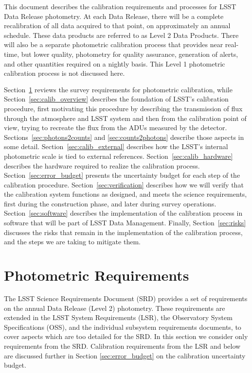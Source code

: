 \documentclass[12pt,preprint]{aastex}
\begin{document}
This document describes the calibration requirements and processes for
LSST Data Release photometry. At each Data Release, there will be a
complete recalibration of all data acquired to that point, on
approximately an annual schedule.  These data products are referred to
as Level 2 Data Products.  There will
also be a separate photometric calibration process that provides
near real-time, but lower quality, photometry for quality assurance,
generation of alerts, and other quantities required on a nightly
basis. This Level 1 photometric
calibration process is not discussed here.

Section~\ref{sec:photoreq} reviews the survey requirements for
photometric calibration, while Section~\ref{sec:calib_overview}
describes the foundation of LSST's calibration procedure, first
motivating this procedure by describing the transmission of flux
through the atmosphere and LSST system and then from the calibration
point of view, trying to recreate the flux from the ADUs measured
by the detector.
Sections~\ref{sec:photons2counts} and \ref{sec:counts2photons}
describe those aspects in some detail.
Section~\ref{sec:calib_external} describes how the LSST's internal
photometric scale is tied to external references.
Section~\ref{sec:calib_hardware} describes the hardware required
to realize the calibration process.
Section~\ref{sec:error_budget} presents the uncertainty budget for each step of the 
calibration procedure.
Section~\ref{sec:verification} describes how we will verify that the
calibration system functions as designed, and meets the science
requirements, first during the construction phase, and later during
survey operations.
Section~\ref{sec:software} describes the implementation of the calibration process
in software that will be part of LSST Data Management.
Finally, Section~\ref{sec:risks} discusses the risks that remain in
the implementation of the calibration process, and the steps we are 
taking to mitigate them.


\section{Photometric Requirements}
\label{sec:photoreq}

The LSST Science Requirements Document (SRD) provides a set of
requirements on the annual Data Release (Level 2) photometry.  These
requirements are extended in the LSST System Requirements (LSR),
the Observatory System Specifications (OSS), and the individual
subsystem requirements documents, to cover aspects which are
too detailed for the SRD.  In this section we consider only 
requirements from the SRD.  Calibration requirements from the LSR
and below are discussed further in Section \ref{sec:error_budget} on the 
calibration uncertainty budget.
\end{document}

